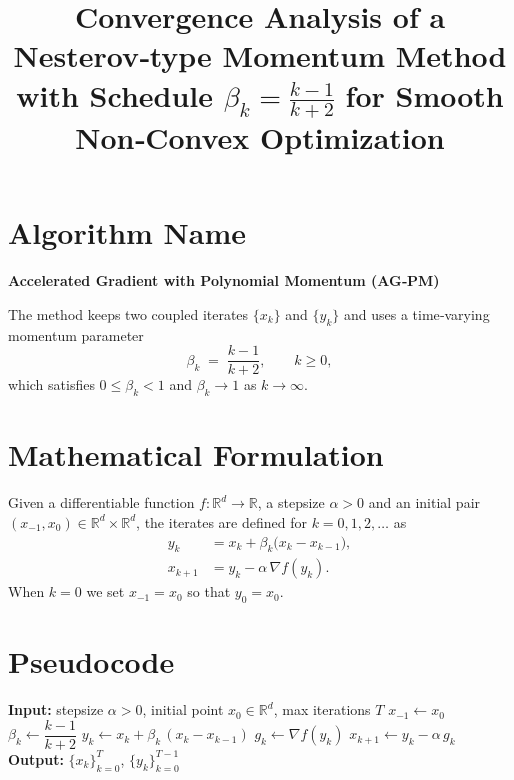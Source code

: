 \documentclass{article}
\newcommand{\R}{\mathbb{R}}
\begin{document}
\title{Convergence Analysis of a Nesterov‑type Momentum Method with Schedule $\displaystyle \beta_k=\frac{k-1}{k+2}$ for Smooth Non‑Convex Optimization}
\author{}
\date{}
\maketitle

\section*{Algorithm Name}
\textbf{Accelerated Gradient with Polynomial Momentum (AG‑PM)}  

The method keeps two coupled iterates $\{x_k\}$ and $\{y_k\}$ and uses a
time‑varying momentum parameter
\[
\beta_k \;=\;\frac{k-1}{k+2},\qquad k\ge 0,
\]
which satisfies $0\le\beta_k<1$ and $\beta_k\to 1$ as $k\to\infty$.

\section*{Mathematical Formulation}
Given a differentiable function $f:\R^d\to\R$, a stepsize $\alpha>0$ and an initial pair
$(x_{-1},x_0)\in\R^d\times\R^d$, the iterates are defined for $k=0,1,2,\dots$ as
\begin{align}
y_k &= x_k + \beta_k\bigl(x_k-x_{k-1}\bigr), \label{eq:y}\\[4pt]
x_{k+1} &= y_k - \alpha\,\nabla f(y_k). \label{eq:x}
\end{align}
When $k=0$ we set $x_{-1}=x_0$ so that $y_0=x_0$.

\section*{Pseudocode}
\begin{algorithm}[H]
\caption{AG‑PM}
\begin{algorithmic}[1]
\State \textbf{Input:} stepsize $\alpha>0$, initial point $x_0\in\R^d$, max iterations $T$
\State $x_{-1}\gets x_0$ 
    \State $\beta_k \gets \dfrac{k-1}{k+2}$ 
    \State $y_k \gets x_k + \beta_k\,(x_k - x_{k-1})$ \label{line:y}
    \State $g_k \gets \nabla f(y_k)$ 
    \State $x_{k+1} \gets y_k - \alpha\, g_k$ \label{line:x}
\EndFor
\State \textbf{Output:} $\{x_k\}_{k=0}^{T}$, $\{y_k\}_{k=0}^{T-1}$
\end{algorithmic}
\end{algorithm}
\end{document}
